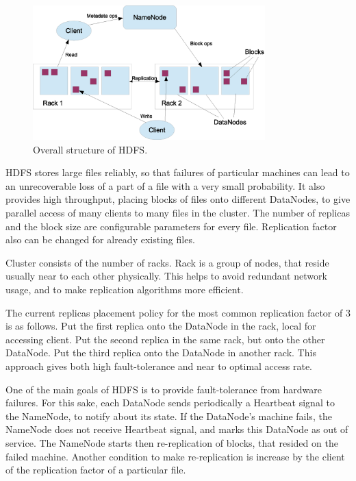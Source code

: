 \begin{figure}[h]
  \centering
  \includegraphics [width=0.8\textwidth]{images/HDFS}
  \caption{Overall structure of HDFS.}
  \label{fig:HDFS}
\end{figure}


HDFS stores large files reliably, so that failures of particular machines can lead to an unrecoverable loss of a part of a file with a very small probability.
It also provides high throughput, placing blocks of files onto different DataNodes, to give parallel access of many clients to many files in the cluster.
The number of replicas and the block size are configurable parameters for every file.
Replication factor also can be changed for already existing files.

Cluster consists of the number of racks.
Rack is a group of nodes, that reside usually near to each other physically.
This helps to avoid redundant network usage, and to make replication algorithms more efficient.

The current replicas placement policy for the most common replication factor of 3 is as follows.
Put the first replica onto the DataNode in the rack, local for accessing client.
Put the second replica in the same rack, but onto the other DataNode.
Put the third replica onto the DataNode in another rack.
This approach gives both high fault-tolerance and near to optimal access rate.


One of the main goals of HDFS is to provide fault-tolerance from hardware failures.
For this sake, each DataNode sends periodically a Heartbeat signal to the NameNode, to notify about its state.
If the DataNode's machine fails, the NameNode does not receive Heartbeat signal, and marks this DataNode as out of service.
The NameNode starts then re-replication of blocks, that resided on the failed machine.
Another condition to make re-replication is increase by the client of the replication factor of a particular file.

